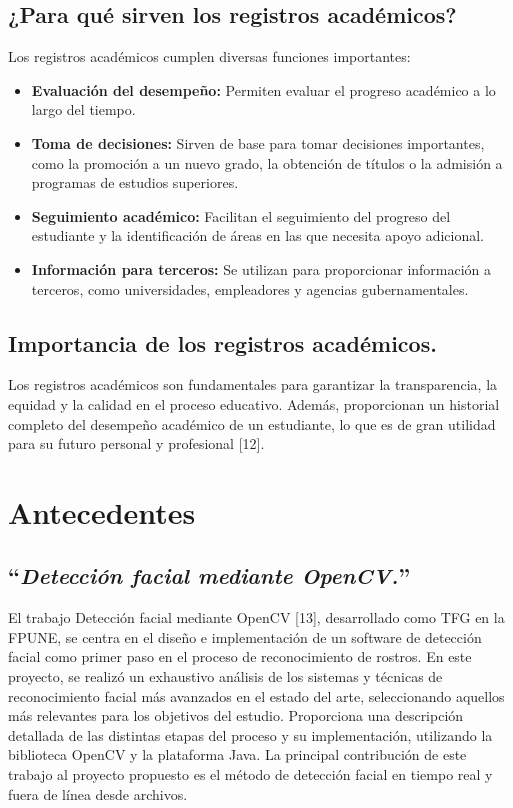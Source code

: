 \subsection{¿Para qué sirven los registros académicos?}
Los registros académicos cumplen diversas funciones importantes:
\begin{itemize}
  \item \textbf{Evaluación del desempeño:} Permiten evaluar el progreso académico a lo largo del tiempo.
  \item \textbf{Toma de decisiones:} Sirven de base para tomar decisiones importantes, como la promoción a un nuevo grado, la obtención de títulos o la admisión a programas de estudios superiores.
  \item \textbf{Seguimiento académico:} Facilitan el seguimiento del progreso del estudiante y la identificación de áreas en las que necesita apoyo adicional.
  \item \textbf{Información para terceros:} Se utilizan para proporcionar información a terceros, como universidades, empleadores y agencias gubernamentales.
\end{itemize}

\subsection{Importancia de los registros académicos.}
Los registros académicos son fundamentales para garantizar la transparencia, la equidad y la calidad en el proceso educativo. Además, proporcionan un historial completo del desempeño académico de un estudiante, lo que es de gran utilidad para su futuro personal y profesional [12].


\section{Antecedentes}

\subsection{``\textit{Detección facial mediante OpenCV.}''}

El trabajo Detección facial mediante OpenCV [13], desarrollado como TFG en la FPUNE, se centra en el diseño e implementación de un software de detección facial como primer paso en el proceso de reconocimiento de rostros. En este proyecto, se realizó un exhaustivo análisis de los sistemas y técnicas de reconocimiento facial más avanzados en el estado del arte, seleccionando aquellos más relevantes para los objetivos del estudio. Proporciona una descripción detallada de las distintas etapas del proceso y su implementación, utilizando la biblioteca OpenCV y la plataforma Java. La principal contribución de este trabajo al proyecto propuesto es el método de detección facial en tiempo real y fuera de línea desde archivos.


